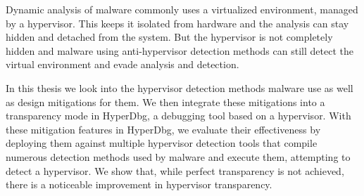 Dynamic analysis of malware commonly uses a virtualized environment, managed by a hypervisor.
This keeps it isolated from hardware and the analysis can stay hidden and detached from the system. But the hypervisor is not completely hidden and malware using anti-hypervisor 
detection methods can still detect the virtual environment and evade analysis and detection. 

In this thesis we look into the hypervisor detection methods malware use as well as design mitigations for them.  
We then integrate these mitigations into a transparency mode in HyperDbg, a debugging tool based on a hypervisor. With these mitigation features in HyperDbg, 
we evaluate their effectiveness by deploying them against multiple hypervisor detection tools that compile numerous detection methods used by malware and execute them, 
attempting to detect a hypervisor. We show that, while perfect transparency is not achieved, there is a noticeable improvement in hypervisor transparency.




